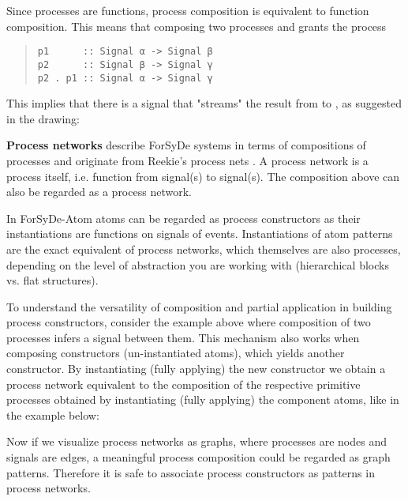  \par
                 Since processes are functions, process composition is equivalent
 to function composition. This means that composing two processes
  and  grants the process \par
\begin{quote}
  {\haddockverb\begin{verbatim}
p1      :: Signal α -> Signal β
p2      :: Signal β -> Signal γ
p2 . p1 :: Signal α -> Signal γ\end{verbatim}}
                 \end{quote}
                 This implies that there is a signal  that
  "streams" the result from  to , as suggested in the
  drawing:\par
                 \par
                 \textbf{Process networks} describe ForSyDe systems in terms of
 compositions of processes and originate from Reekie's process
 nets \cite{Reekie95}. A process network is a process itself,
 i.e. function from signal(s) to signal(s). The composition above
  can also be regarded as a process network.\par
                 In ForSyDe-Atom atoms can be regarded as process constructors as
 their instantiations are functions on signals of events.
 Instantiations of atom patterns are the exact equivalent of
 process networks, which themselves are also processes, depending
 on the level of abstraction you are working with (hierarchical
 blocks vs. flat structures).\par
                 To understand the versatility of composition and partial
 application in building process constructors, consider the
 example above where composition of two processes infers a signal
 between them. This mechanism also works when composing
 constructors (un-instantiated atoms), which yields another
 constructor. By instantiating (fully applying) the new
 constructor we obtain a process network equivalent to the
 composition of the respective primitive processes obtained by
 instantiating (fully applying) the component atoms, like in the
 example below:\par
                 \par
                 Now if we visualize process networks as graphs, where processes
 are nodes and signals are edges, a meaningful process composition
 could be regarded as graph patterns. Therefore it is safe to
 associate process constructors as patterns in process networks.\par
                 
